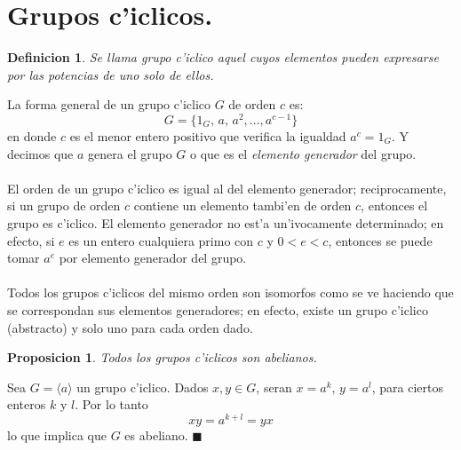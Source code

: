 \documentclass[a4paper,openright,12pt]{book}
\numberwithin{equation}{section} %
\newtheorem{proposicion}{Proposicion}[section] %
\newtheorem{definicion}{Definicion}[section] %
\newenvironment{proof}{\noindent{\it Demostracion:}}{\hfill$\blacksquare$} %
\begin{document}
\section{Grupos c'iclicos.}
\begin{definicion}
Se llama grupo c'iclico aquel cuyos elementos pueden expresarse por las potencias de uno solo de ellos.
\end{definicion}
La forma general de un grupo c'iclico $G$ de orden $c$ es:
\[
G=\{ 1_{G},\, a, \, a^{2},\ldots, a^{c-1} \}
\]
en donde $c$ es el menor entero positivo que verifica la igualdad $a^{c}=1_{G}$. Y decimos que $a$ genera el grupo $G$ o que es el \textit{elemento generador} del grupo.\\
\\
El orden de un grupo c'iclico es igual al del elemento generador; reciprocamente, si un grupo de orden $c$ contiene un elemento tambi'en de orden $c$, entonces el grupo es c'iclico. El elemento generador no est'a un'ivocamente determinado; en efecto, si $e$ es un entero cualquiera primo con $c$ y $0<e<c$, entonces se puede tomar $a^{e}$ por elemento generador del grupo.\\
\\
Todos los grupos c'iclicos del mismo orden son isomorfos como se ve haciendo que se correspondan sus elementos generadores; en efecto, existe un grupo c'iclico (abstracto) y solo uno para cada orden dado.
\begin{proposicion}
Todos los grupos c'iclicos son abelianos.
\end{proposicion}
\begin{proof}
Sea $G=\langle a \rangle$ un grupo c'iclico. Dados $x,y \in G$, seran $x=a^{k}$, $y=a^{l}$, para ciertos enteros $k$ y $l$. Por lo tanto
\[
xy=a^{k+l}=yx
\]
lo que implica que $G$ es abeliano.
\end{proof}
\end{document}
